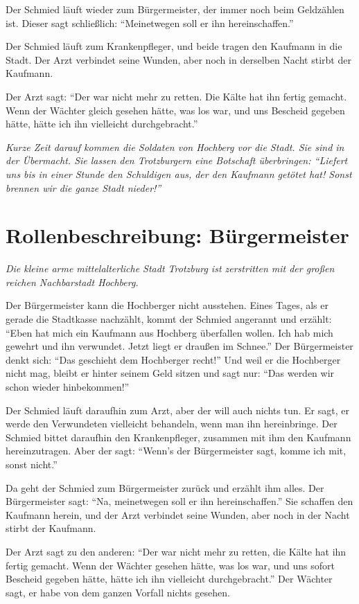 Der Schmied läuft wieder zum Bürgermeister, der immer noch beim Geldzählen ist. Dieser sagt schließlich: "`Meinetwegen soll er ihn hereinschaffen."'

Der Schmied läuft zum Krankenpfleger, und beide tragen den Kaufmann in die Stadt. Der Arzt verbindet seine Wunden, aber noch in derselben Nacht stirbt der Kaufmann.

Der Arzt sagt: "`Der war nicht mehr zu retten. Die Kälte hat ihn fertig gemacht. Wenn der Wächter gleich gesehen hätte, was los war, und uns Bescheid gegeben hätte, hätte ich ihn vielleicht durchgebracht."'

\emph{Kurze Zeit darauf kommen die Soldaten von Hochberg vor die Stadt. Sie sind in der Übermacht. Sie lassen den Trotzburgern eine Botschaft überbringen: "`Liefert uns bis in einer Stunde den Schuldigen aus, der den Kaufmann getötet hat! Sonst brennen wir die ganze Stadt nieder!"'}
\newpage

\section*{Rollenbeschreibung: Bürgermeister}

\emph{Die kleine arme mittelalterliche Stadt Trotzburg ist zerstritten mit der großen reichen Nachbarstadt Hochberg.}

Der Bürgermeister kann die Hochberger nicht ausstehen. Eines Tages, als er gerade die Stadtkasse nachzählt, kommt der Schmied angerannt und erzählt: "`Eben hat mich ein Kaufmann aus Hochberg überfallen wollen. Ich hab mich gewehrt und ihn verwundet. Jetzt liegt er draußen im Schnee."' Der Bürgermeister denkt sich: "`Das geschieht dem Hochberger recht!"' Und weil er die Hochberger nicht mag, bleibt er hinter seinem Geld sitzen und sagt nur: "`Das werden wir schon wieder hinbekommen!"'

Der Schmied läuft daraufhin zum Arzt, aber der will auch nichts tun. Er sagt, er werde den Verwundeten vielleicht behandeln, wenn man ihn hereinbringe. Der Schmied bittet daraufhin den Krankenpfleger, zusammen mit ihm den Kaufmann hereinzutragen. Aber der sagt: "`Wenn's der Bürgermeister sagt, komme ich mit, sonst nicht."'

Da geht der Schmied zum Bürgermeister zurück und erzählt ihm alles. Der Bürgermeister sagt: "`Na, meinetwegen soll er ihn hereinschaffen."' Sie schaffen den Kaufmann herein, und der Arzt verbindet seine Wunden, aber noch in der Nacht stirbt der Kaufmann.

Der Arzt sagt zu den anderen: "`Der war nicht mehr zu retten, die Kälte hat ihn fertig gemacht. Wenn der Wächter gesehen hätte, was los war, und uns sofort Bescheid gegeben hätte, hätte ich ihn vielleicht durchgebracht."' Der Wächter sagt, er habe von dem ganzen Vorfall nichts gesehen.

